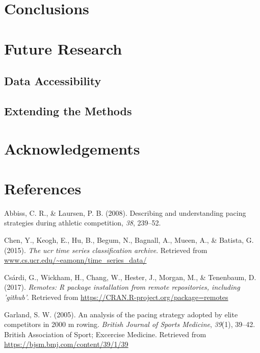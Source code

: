 \documentclass[11pt,]{article}
\begin{document}
\section{Conclusions}\label{conclusions}

\section{Future Research}\label{future-research}

\subsection{Data Accessibility}\label{data-accessibility}

\subsection{Extending the Methods}\label{extending-the-methods}

\section{Acknowledgements}\label{acknowledgements}

\pagebreak

\section*{References}\label{references}

\hypertarget{refs}{}
\hypertarget{ref-Abbiss}{}
Abbiss, C. R., \& Laursen, P. B. (2008). Describing and understanding
pacing strategies during athletic competition, \emph{38}, 239--52.

\hypertarget{ref-UCR}{}
Chen, Y., Keogh, E., Hu, B., Begum, N., Bagnall, A., Mueen, A., \&
Batista, G. (2015). \emph{The ucr time series classification archive}.
Retrieved from \url{www.cs.ucr.edu/~eamonn/time_series_data/}

\hypertarget{ref-remotes}{}
Csárdi, G., Wickham, H., Chang, W., Hester, J., Morgan, M., \&
Tenenbaum, D. (2017). \emph{Remotes: R package installation from remote
repositories, including 'github'}. Retrieved from
\url{https://CRAN.R-project.org/package=remotes}

\hypertarget{ref-Garland}{}
Garland, S. W. (2005). An analysis of the pacing strategy adopted by
elite competitors in 2000 m rowing. \emph{British Journal of Sports
Medicine}, \emph{39}(1), 39--42. British Association of Sport; Excercise
Medicine. Retrieved from \url{https://bjsm.bmj.com/content/39/1/39}
\end{document}
